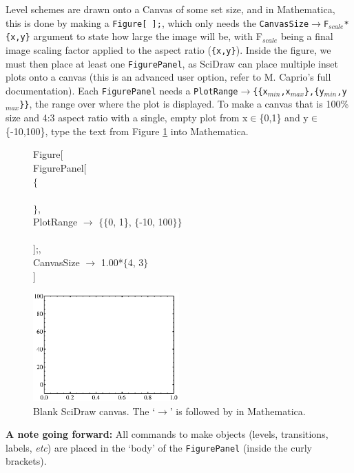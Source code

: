 \documentclass[portrait,10pt]{article}
\begin{document}
Level schemes are drawn onto a Canvas of some set size, and in Mathematica, this is done by making a {\tt Figure[ ];}, which only needs the {\tt CanvasSize$\rightarrow$F$_{scale}$*\{x,y\}} argument to state how large the image will be, with F$_{scale}$ being a final image scaling factor applied to the aspect ratio ({\tt \{x,y\}}). Inside the figure, we must then place at least one {\tt FigurePanel}, as SciDraw can place multiple inset plots onto a canvas (this is an advanced user option, refer to M. Caprio's full documentation). Each {\tt FigurePanel} needs a {\tt PlotRange$\rightarrow$\{\{x$_{min}$,x$_{max}$\},\{y$_{min}$,y$_{max}$\}\}}, the range over where the plot is displayed. To make a canvas that is 100\% size and 4:3 aspect ratio with a single, empty plot from x$\in$\{0,1\} and y$\in$\{-10,100\}, type the text from Figure \ref{text:blankcanvas} into Mathematica.

\begin{figure}[h]
\begin{tt}
Figure[\\
 FigurePanel[\\
  $\{$\\
   \\
   $\}$,\\
  PlotRange $\rightarrow$ $\{\{$0, 1\}, $\{$-10, 100$\}\}$\\
  \\
  ];,\\
 CanvasSize $\rightarrow$ 1.00*$\{$4, 3$\}$\\
 ]\\
\end{tt}
\begin{center}
\includegraphics[width=0.5\textwidth]{BlankCanvas.eps}
\end{center}
\caption{Blank SciDraw canvas. The `$\rightarrow$' is \keystroke{-} followed by \keystroke{$>$} in Mathematica. \label{text:blankcanvas}}
 \end{figure}

\textbf{A note going forward:} All commands to make objects (levels, transitions, labels, \textit{etc}) are placed in the `body' of the {\tt FigurePanel} (inside the curly brackets).
\end{document}
